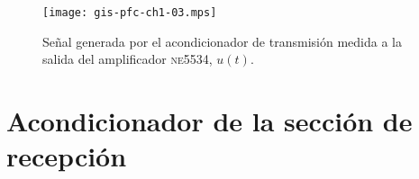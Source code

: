 \begin{figure}
	\begin{center}
		\texttt{[image: gis-pfc-ch1-03.mps]}
	\end{center}
	\caption[Señal a la salida del amplificador \textsc{ne5534},
	$u(t)$]{Señal generada por el acondicionador de transmisión medida
	a la salida del amplificador \textsc{ne5534}, $u(t)$.}
	\label{fig:txacvo}
\end{figure}


\section{Acondicionador de la sección de recepción}\label{sec:rxco}
